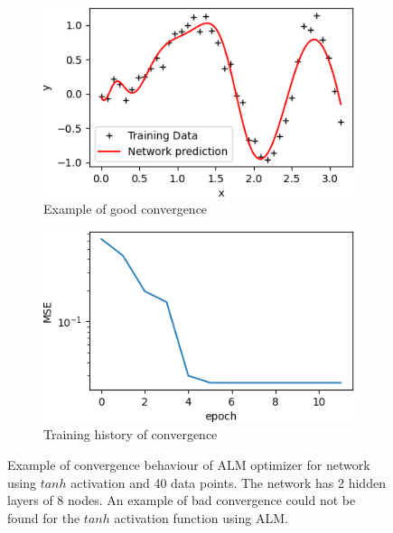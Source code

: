 \begin{figure}
     \centering
     \begin{subfigure}[b]{0.49\textwidth}
         \centering
         \includegraphics[width=\textwidth]{almgood}
         \caption{Example of good convergence}
         \label{almgood}
     \end{subfigure}
     \begin{subfigure}[b]{0.49\textwidth}
         \centering
         \includegraphics[width=\textwidth]{almgoodconv}
         \caption{Training history of convergence}
         \label{almgoodconv}
     \end{subfigure}
     \caption{Example of convergence behaviour of ALM optimizer for network using $tanh$ activation and 40 data points. The network has 2 hidden layers of 8 nodes. An example of bad convergence could not be found for the $tanh$ activation function using ALM.}
     \label{almconv}
\end{figure}

